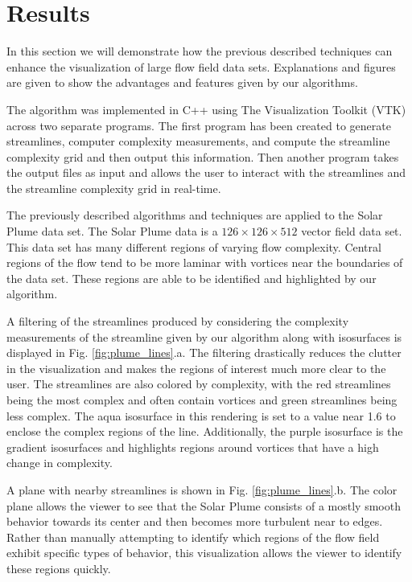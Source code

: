 \documentclass{egpubl}
\begin{document}
\section{Results} \label{sec:examples}

In this section we will demonstrate how the previous described techniques can enhance the visualization of large flow field data sets.
Explanations and figures are given to show the advantages and features given by our algorithms.

The algorithm was implemented in C++ using The Visualization Toolkit (VTK) across two separate programs.
The first program has been created to generate streamlines, computer complexity measurements, and compute the streamline complexity grid and then output this information.
Then another program takes the output files as input and allows the user to interact with the streamlines and the streamline complexity grid in real-time.

The previously described algorithms and techniques are applied to the Solar Plume data set.
The Solar Plume data is a $126 \times 126 \times 512$ vector field data set.
This data set has many different regions of varying flow complexity.
Central regions of the flow tend to be more laminar with vortices near the boundaries of the data set.
These regions are able to be identified and highlighted by our algorithm.

A filtering of the streamlines produced by considering the complexity measurements of the streamline given by our algorithm along with isosurfaces is displayed in Fig. \ref{fig:plume_lines}.a.
The filtering drastically reduces the clutter in the visualization and makes the regions of interest much more clear to the user.
The streamlines are also colored by complexity, with the red streamlines being the most complex and often contain vortices and green streamlines being less complex.
The aqua isosurface in this rendering is set to a value near 1.6 to enclose the complex regions of the line.
Additionally, the purple isosurface is the gradient isosurfaces and highlights regions around vortices that have a high change in complexity.

A plane with nearby streamlines is shown in Fig. \ref{fig:plume_lines}.b.
The color plane allows the viewer to see that the Solar Plume consists of a mostly smooth behavior towards its center and then becomes more turbulent near to edges.
Rather than manually attempting to identify which regions of the flow field exhibit specific types of behavior, this visualization allows the viewer to identify these regions quickly.
\end{document}
